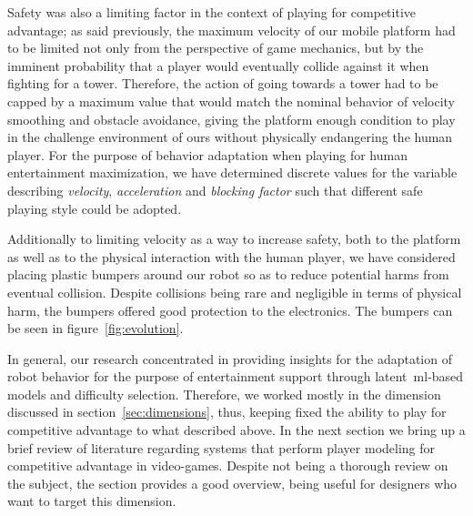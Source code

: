 Safety was also a limiting factor in the context of playing for competitive advantage; as said previously, the maximum velocity of our mobile platform had to be limited not only from the perspective of game mechanics, but by the imminent probability that a player would eventually collide against it when fighting for a tower. Therefore, the action of going towards a tower had to be capped by a maximum value that would match the nominal behavior of velocity smoothing and obstacle avoidance, giving the platform enough condition to play in the challenge environment of ours without physically endangering the human player. For the purpose of behavior adaptation when playing for human entertainment maximization, we have determined discrete values for the variable describing \textit{velocity}, \textit{acceleration} and \textit{blocking factor} such that different safe playing style could be adopted.

Additionally to limiting velocity as a way to increase safety, both to the platform as well as to the physical interaction with the human player, we have considered placing plastic bumpers around our robot so as to reduce potential harms from eventual collision. Despite collisions being rare and negligible in terms of physical harm, the bumpers offered good protection to the electronics. The bumpers can be seen in figure~\ref{fig:evolution}. 

In general, our research concentrated in providing insights for the adaptation of robot behavior for the purpose of entertainment support through latent~\gls{ml}-based models and difficulty selection. Therefore, we worked mostly in the dimension discussed in section~\ref{sec:dimensions}, thus, keeping fixed the ability to play for competitive advantage to what described above. In the next section we bring up a brief review of literature regarding systems that perform player modeling for competitive advantage in video-games. Despite not being a thorough review on the subject, the section provides a good overview, being useful for designers who want to target this dimension.


